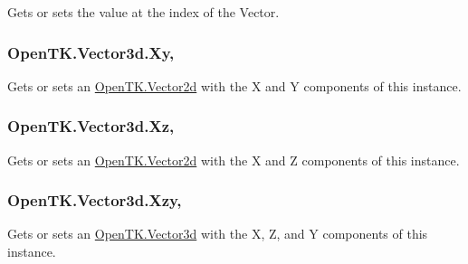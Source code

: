Gets or sets the value at the index of the Vector. 

\hypertarget{struct_open_t_k_1_1_vector3d_ae67054daed5a4c1e080b1550d4022276}{
\subsubsection[{Xy}]{ Open\-T\-K.\-Vector3d.\-Xy\hspace{0.3cm}{\ttfamily [get]}, {\ttfamily [set]}}}\label{struct_open_t_k_1_1_vector3d_ae67054daed5a4c1e080b1550d4022276}


Gets or sets an \hyperlink{struct_open_t_k_1_1_vector2d}{Open\-T\-K.\-Vector2d} with the X and Y components of this instance. 

\hypertarget{struct_open_t_k_1_1_vector3d_a7072875ab2d574f202617f985311cd0d}{
\subsubsection[{Xz}]{ Open\-T\-K.\-Vector3d.\-Xz\hspace{0.3cm}{\ttfamily [get]}, {\ttfamily [set]}}}\label{struct_open_t_k_1_1_vector3d_a7072875ab2d574f202617f985311cd0d}


Gets or sets an \hyperlink{struct_open_t_k_1_1_vector2d}{Open\-T\-K.\-Vector2d} with the X and Z components of this instance. 

\hypertarget{struct_open_t_k_1_1_vector3d_ab7f5d1a104fcf24bb79cccb06dfbc99d}{
\subsubsection[{Xzy}]{ Open\-T\-K.\-Vector3d.\-Xzy\hspace{0.3cm}{\ttfamily [get]}, {\ttfamily [set]}}}\label{struct_open_t_k_1_1_vector3d_ab7f5d1a104fcf24bb79cccb06dfbc99d}


Gets or sets an \hyperlink{struct_open_t_k_1_1_vector3d}{Open\-T\-K.\-Vector3d} with the X, Z, and Y components of this instance. 

